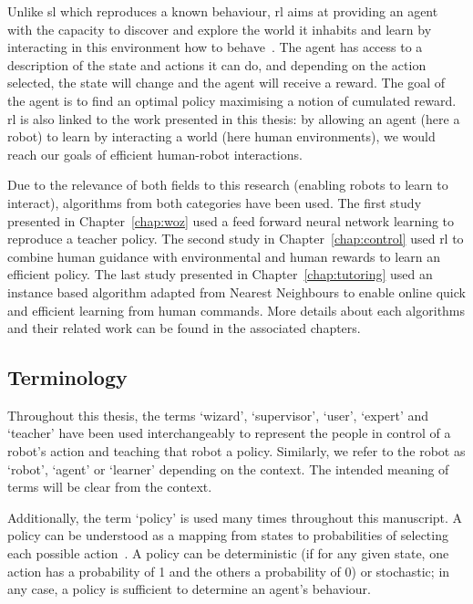 Unlike \gls{sl} which reproduces a known behaviour, \gls{rl} aims at providing an agent with the capacity to discover and explore the world it inhabits and learn by interacting in this environment how to behave~\citep{sutton1998reinforcement}. The agent has access to a description of the state and actions it can do, and depending on the action selected, the state will change and the agent will receive a reward. The goal of the agent is to find an optimal policy maximising a notion of cumulated reward. \gls{rl} is also linked to the work presented in this thesis: by allowing an agent (here a robot) to learn by interacting a world (here human environments), we would reach our goals of efficient human-robot interactions.

Due to the relevance of both fields to this research (enabling robots to learn to interact), algorithms from both categories have been used. The first study presented in Chapter~\ref{chap:woz} used a feed forward neural network learning to reproduce a teacher policy. The second study in Chapter~\ref{chap:control} used \gls{rl} to combine human guidance with environmental and human rewards to learn an efficient policy. The last study presented in Chapter~\ref{chap:tutoring} used an instance based algorithm adapted from Nearest Neighbours to enable online quick and efficient learning from human commands. More details about each algorithms and their related work can be found in the associated chapters.

\subsection{Terminology}

Throughout this thesis, the terms `wizard', `supervisor', `user', `expert' and `teacher' have been used interchangeably to represent the people in control of a robot's action and teaching that robot a policy. Similarly, we refer to the robot as `robot', `agent' or `learner' depending on the context. The intended meaning of terms will be clear from the context.

Additionally, the term `policy' is used many times throughout this manuscript. A policy can be understood as a mapping from states to probabilities of selecting each possible action~\citep{sutton1998reinforcement}. A policy can be deterministic (if for any given state, one action has a probability of 1 and the others a probability of 0) or stochastic; in any case, a policy is sufficient to determine an agent's behaviour.


